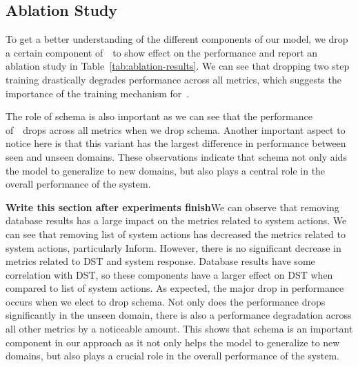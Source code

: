 \subsection{Ablation Study}

To get a better understanding of the different components of our model, we drop a certain component of~\oursys~to show effect on the performance
and report an ablation study in Table~\ref{tab:ablation-results}.
We can see that dropping two step training drastically degrades performance across all metrics, which suggests the importance of the training mechanism for~\oursys.

The role of schema is also important as we can see that the performance of~\oursys~drops across all metrics when we drop schema.
Another important aspect to notice here is that this variant has the largest difference in performance between seen and unseen domains.
These observations indicate that schema not only aids the model to generalize to new domains, but also plays a central role in the overall performance of the system.

\textbf{Write this section after experiments finish}We can observe that removing database results has a large impact on the metrics related to system actions.
We can see that removing list of system actions has decreased the metrics related to system actions, particularly Inform.
However, there is no significant decrease in metrics related to DST and system response. Database results have some correlation with DST,
so these components have a larger effect on DST when compared to list of system actions. As expected, the major drop in performance occurs when we
elect to drop schema. Not only does the performance drops significantly in the unseen domain, there is also a performance degradation
across all other metrics by a noticeable amount. This shows that schema is an important component in our approach as
it not only helps the model to generalize to new domains, but also plays a crucial role in the overall performance of the system.






